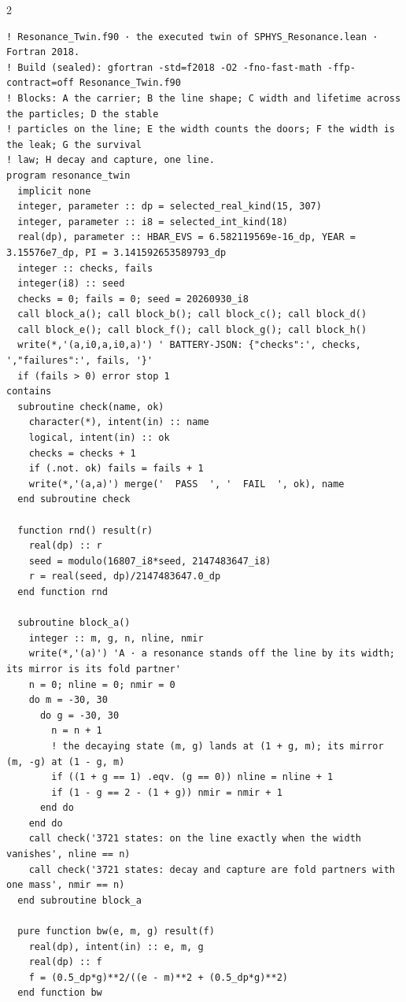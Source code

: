 \documentclass[10pt]{article}
\begin{document}
\begin{multicols}{2}
\begin{Verbatim}[fontsize=\fontsize{5.9}{6.8}\selectfont,breaklines,breakanywhere,breaksymbolleft={}]
! Resonance_Twin.f90 · the executed twin of SPHYS_Resonance.lean · Fortran 2018.
! Build (sealed): gfortran -std=f2018 -O2 -fno-fast-math -ffp-contract=off Resonance_Twin.f90
! Blocks: A the carrier; B the line shape; C width and lifetime across the particles; D the stable
! particles on the line; E the width counts the doors; F the width is the leak; G the survival
! law; H decay and capture, one line.
program resonance_twin
  implicit none
  integer, parameter :: dp = selected_real_kind(15, 307)
  integer, parameter :: i8 = selected_int_kind(18)
  real(dp), parameter :: HBAR_EVS = 6.582119569e-16_dp, YEAR = 3.15576e7_dp, PI = 3.141592653589793_dp
  integer :: checks, fails
  integer(i8) :: seed
  checks = 0; fails = 0; seed = 20260930_i8
  call block_a(); call block_b(); call block_c(); call block_d()
  call block_e(); call block_f(); call block_g(); call block_h()
  write(*,'(a,i0,a,i0,a)') ' BATTERY-JSON: {"checks":', checks, ',"failures":', fails, '}'
  if (fails > 0) error stop 1
contains
  subroutine check(name, ok)
    character(*), intent(in) :: name
    logical, intent(in) :: ok
    checks = checks + 1
    if (.not. ok) fails = fails + 1
    write(*,'(a,a)') merge('  PASS  ', '  FAIL  ', ok), name
  end subroutine check

  function rnd() result(r)
    real(dp) :: r
    seed = modulo(16807_i8*seed, 2147483647_i8)
    r = real(seed, dp)/2147483647.0_dp
  end function rnd

  subroutine block_a()
    integer :: m, g, n, nline, nmir
    write(*,'(a)') 'A · a resonance stands off the line by its width; its mirror is its fold partner'
    n = 0; nline = 0; nmir = 0
    do m = -30, 30
      do g = -30, 30
        n = n + 1
        ! the decaying state (m, g) lands at (1 + g, m); its mirror (m, -g) at (1 - g, m)
        if ((1 + g == 1) .eqv. (g == 0)) nline = nline + 1
        if (1 - g == 2 - (1 + g)) nmir = nmir + 1
      end do
    end do
    call check('3721 states: on the line exactly when the width vanishes', nline == n)
    call check('3721 states: decay and capture are fold partners with one mass', nmir == n)
  end subroutine block_a

  pure function bw(e, m, g) result(f)
    real(dp), intent(in) :: e, m, g
    real(dp) :: f
    f = (0.5_dp*g)**2/((e - m)**2 + (0.5_dp*g)**2)
  end function bw


\end{Verbatim}
\end{multicols}
\end{document}

